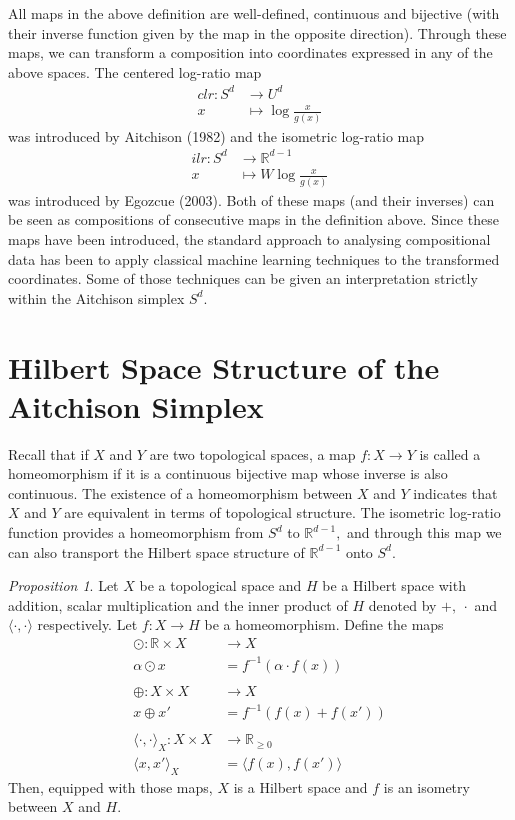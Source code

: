 \documentclass[BSc]{usydthesis}
\numberwithin{equation}{chapter}
\theoremstyle{remark}
\newtheorem{Proposition}[equation]{Proposition}
\begin{document}
All maps in the above definition are well-defined, continuous and bijective (with their inverse function given by the map in the opposite direction). Through these maps, we can transform a composition into coordinates expressed in any of the above spaces. The centered log-ratio map 
\begin{align*}
 clr : S^d &\to U^d \\
    x &\mapsto \log \frac{x}{g(x)}
\end{align*} 
was introduced by Aitchison (1982) and the isometric log-ratio map 
\begin{align*}
 ilr : S^d &\to \mathbb{R}^{d-1} \\
    x &\mapsto W \log \frac{x}{g(x)}
\end{align*}
was introduced by Egozcue (2003). Both of these maps (and their inverses) can be seen as compositions of consecutive maps in the definition above. Since these maps have been introduced, the standard approach to analysing compositional data has been to apply classical machine learning techniques to the transformed coordinates. Some of those techniques can be given an interpretation strictly within the Aitchison simplex $S^d.$


\section{Hilbert Space Structure of the Aitchison Simplex}
Recall that if $X$ and $Y$ are two topological spaces, a map $f:X\to Y$ is called a homeomorphism if it is a continuous bijective map whose inverse is also continuous. The existence of a homeomorphism between $X$ and $Y$ indicates that $X$ and $Y$ are equivalent in terms of topological structure. The isometric log-ratio function provides a homeomorphism from $S^d$ to $\mathbb{R}^{d-1},$ and through this map we can also transport the Hilbert space structure of $\mathbb{R}^{d-1}$ onto $S^d.$ 

\begin{Proposition}
 Let $X$ be a topological space and $H$ be a Hilbert space with addition, scalar multiplication and the inner product of $H$ denoted by $+,\  \cdot$ and $ \langle \cdot, \cdot \rangle$ respectively. Let $f: X \to H$ be a homeomorphism. Define the maps
\begin{align*}
 \odot : \mathbb{R} \times X &\to X \\
    \alpha \odot x &= f^{-1}( \alpha \cdot f(x) )\\
    \ \\
 \oplus : X \times X &\to X \\
    x \oplus x' &= f^{-1}( f(x) + f(x'))\\
    \ \\
 \langle \cdot, \cdot \rangle_X : X \times X &\to \mathbb{R}_{\geq 0} \\
    \langle x, x' \rangle_X &= \langle f(x), f(x') \rangle
\end{align*}
Then, equipped with those maps, $X$ is a Hilbert space and $f$ is an isometry between $X$ and $H.$
\end{Proposition}
\end{document}
